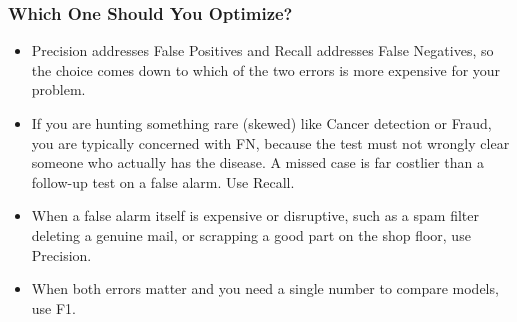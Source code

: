 




\begin{frame}[fragile]\frametitle{Which One Should You Optimize?}
\begin{itemize}
\item Precision addresses False Positives and Recall addresses False Negatives, so the choice comes down to which of the two errors is more expensive for your problem.
\item If you are hunting something rare (skewed) like Cancer detection or Fraud, you are typically concerned with FN, because the test must not wrongly clear someone who actually has the disease. A missed case is far costlier than a follow-up test on a false alarm. Use Recall.
\item When a false alarm itself is expensive or disruptive, such as a spam filter deleting a genuine mail, or scrapping a good part on the shop floor, use Precision.
\item When both errors matter and you need a single number to compare models, use F1.
\end{itemize}
\end{frame}



